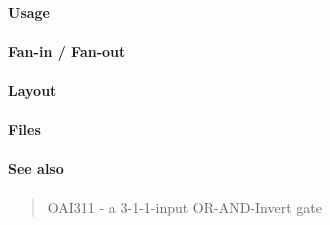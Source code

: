 \paragraph{Usage}

\paragraph{Fan-in / Fan-out}

\paragraph{Layout}

\paragraph{Files}

\paragraph{See also}
\begin{quote}
    OAI311 - a 3-1-1-input OR-AND-Invert gate
\end{quote}
